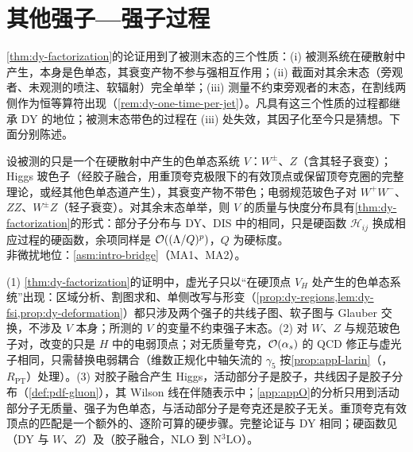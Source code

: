 \section{其他强子—强子过程}\label{sec:dy-other}

\cref{thm:dy-factorization}的论证用到了被测末态的三个性质：(i) 被测系统在硬散射中产生，本身是色单态，其衰变产物不参与强相互作用；(ii) 截面对其余末态（旁观者、未观测的喷注、软辐射）完全单举；(iii) 测量不约束旁观者的末态，在割线两侧作为恒等算符出现（\cref{rem:dy-one-time-per-jet}）。凡具有这三个性质的过程都继承 DY 的地位；被测末态带色的过程在 (iii) 处失效，其因子化至今只是猜想。下面分别陈述。

\begin{theorem}\label{thm:dy-colour-singlet}
设被测的只是一个在硬散射中产生的色单态系统 $V$：$W^\pm$、$Z$（含其轻子衰变）；Higgs 玻色子（经胶子融合，用重顶夸克极限下的有效顶点或保留顶夸克圈的完整理论，或经其他色单态道产生），其衰变产物不带色；电弱规范玻色子对 $W^+W^-$、$ZZ$、$W^\pm Z$（轻子衰变）。对其余末态单举，则 $V$ 的质量与快度分布具有\cref{thm:dy-factorization}的形式：部分子分布与 DY、DIS 中的相同，只是硬函数 $\mathcal H_{ij}$ 换成相应过程的硬函数，余项同样是 $\mathcal{O}\!\left((\Lambda/Q)^p\right)$，$Q$ 为硬标度。\\
非微扰地位：\cref{asm:intro-bridge}（MA1、MA2）。
\end{theorem}

\begin{proofsketch}
(1) \cref{thm:dy-factorization}的证明中，虚光子只以“在硬顶点 $V_H$ 处产生的色单态系统”出现：区域分析、割图求和、单侧改写与形变（\cref{prop:dy-regions,lem:dy-fsi,prop:dy-deformation}）都只涉及两个强子的共线子图、软子图与 Glauber 交换，不涉及 $V$ 本身；所测的 $V$ 的变量不约束强子末态。(2) 对 $W$、$Z$ 与规范玻色子对，改变的只是 $H$ 中的电弱顶点；对无质量夸克，$\mathcal{O}\!\left(\alpha_s\right)$ 的 QCD 修正与虚光子相同，只需替换电弱耦合（维数正规化中轴矢流的 $\gamma_5$ 按\cref{prop:appI-larin}（\tagR，$R_{\mathrm{PT}}$）处理）。(3) 对胶子融合产生 Higgs，活动部分子是胶子，共线因子是胶子分布（\cref{def:pdf-gluon}），其 Wilson 线在伴随表示中；\cref{app:appO}的分析只用到活动部分子无质量、强子为色单态，与活动部分子是夸克还是胶子无关。重顶夸克有效顶点的匹配是一个额外的、逐阶可算的硬步骤。完整论证与 DY 相同\cite[第~14.4~节]{Collins2011}；硬函数见\cite{AltarelliEllisMartinelli1979,HambergVanNeervenMatsuura1991}（DY 与 $W$、$Z$）及\cite{Dawson1991,DjouadiSpiraZerwas1991,HarlanderKilgore2002,AnastasiouEtAl2015}（胶子融合，NLO 到 N$^3$LO）。
\end{proofsketch}

